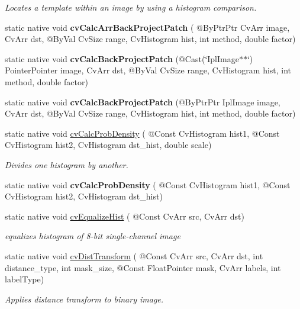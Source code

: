 \begin{DoxyCompactItemize}
\begin{DoxyCompactList}\small\item\em Locates a template within an image by using a histogram comparison. \end{DoxyCompactList}\item 
static native void {\bfseries cv\+Calc\+Arr\+Back\+Project\+Patch} ( @By\+Ptr\+Ptr Cv\+Arr image, Cv\+Arr dst, @By\+Val Cv\+Size range, Cv\+Histogram hist, int method, double factor)
\item 
static native void {\bfseries cv\+Calc\+Back\+Project\+Patch} (@Cast(\char`\"{}Ipl\+Image$\ast$$\ast$\char`\"{}) Pointer\+Pointer image, Cv\+Arr dst, @By\+Val Cv\+Size range, Cv\+Histogram hist, int method, double factor)
\item 
static native void {\bfseries cv\+Calc\+Back\+Project\+Patch} (@By\+Ptr\+Ptr Ipl\+Image image, Cv\+Arr dst, @By\+Val Cv\+Size range, Cv\+Histogram hist, int method, double factor)
\item 
static native void \hyperlink{group__imgproc__c_ga4a08e20f0a1dc639f2d1052b77f9a024}{cv\+Calc\+Prob\+Density} ( @Const Cv\+Histogram hist1, @Const Cv\+Histogram hist2, Cv\+Histogram dst\+\_\+hist, double scale)
\begin{DoxyCompactList}\small\item\em Divides one histogram by another. \end{DoxyCompactList}\item 
static native void {\bfseries cv\+Calc\+Prob\+Density} ( @Const Cv\+Histogram hist1, @Const Cv\+Histogram hist2, Cv\+Histogram dst\+\_\+hist)
\item 
static native void \hyperlink{group__imgproc__c_gadeca2750f8eaf0fd4c145149f4e0ff00}{cv\+Equalize\+Hist} ( @Const Cv\+Arr src, Cv\+Arr dst)
\begin{DoxyCompactList}\small\item\em equalizes histogram of 8-\/bit single-\/channel image \end{DoxyCompactList}\item 
static native void \hyperlink{group__imgproc__c_ga1d40b29d515e71fe7026248f482923d6}{cv\+Dist\+Transform} ( @Const Cv\+Arr src, Cv\+Arr dst, int distance\+\_\+type, int mask\+\_\+size, @Const Float\+Pointer mask, Cv\+Arr labels, int label\+Type)
\begin{DoxyCompactList}\small\item\em Applies distance transform to binary image. \end{DoxyCompactList}\item 
$$
\end{DoxyCompactItemize}
